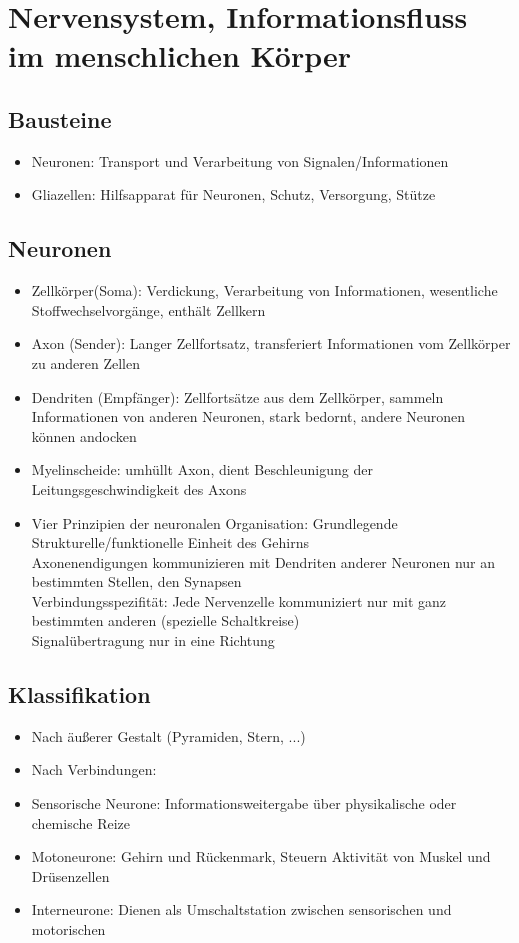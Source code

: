\documentclass[a4paper,10pt,oneside]{article}
\begin{document}
\section{Nervensystem, Informationsfluss im menschlichen Körper}

\subsection{Bausteine}
\begin{itemize}
	\item Neuronen: Transport und Verarbeitung von Signalen/Informationen
	\item Gliazellen: Hilfsapparat für Neuronen, Schutz, Versorgung, Stütze
\end{itemize}


\subsection{Neuronen}
\begin{itemize}
	\item Zellkörper(Soma): Verdickung, Verarbeitung von Informationen, wesentliche Stoffwechselvorgänge, enthält Zellkern
	\item Axon (Sender): Langer Zellfortsatz, transferiert Informationen vom Zellkörper zu anderen Zellen
	\item Dendriten (Empfänger): Zellfortsätze aus dem Zellkörper, sammeln Informationen von anderen Neuronen, stark bedornt, andere Neuronen können andocken
	\item Myelinscheide: umhüllt Axon, dient Beschleunigung der Leitungsgeschwindigkeit des Axons
	\item Vier Prinzipien der neuronalen Organisation:
	Grundlegende Strukturelle/funktionelle Einheit des Gehirns \\
	Axonenendigungen kommunizieren mit Dendriten anderer Neuronen nur an bestimmten Stellen, den Synapsen \\
	Verbindungsspezifität: Jede Nervenzelle kommuniziert nur mit ganz bestimmten anderen (spezielle Schaltkreise) \\
	Signalübertragung nur in eine Richtung
\end{itemize}



\subsection{Klassifikation}
\begin{itemize}
	\item Nach äußerer Gestalt (Pyramiden, Stern, ...)
	\item Nach Verbindungen:
	\item Sensorische Neurone: Informationsweitergabe über physikalische oder chemische Reize
	\item Motoneurone: Gehirn und Rückenmark, Steuern Aktivität von Muskel und Drüsenzellen
	\item Interneurone: Dienen als Umschaltstation zwischen sensorischen und motorischen
\end{itemize}
\end{document}
